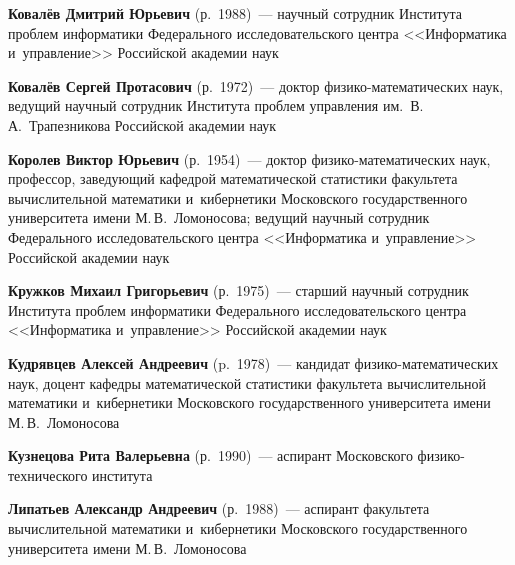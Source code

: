 \begin{multicols}{2}
   \vspace*{3pt}
   




\noindent
  \textbf{Ковалёв Дмитрий Юрьевич} (р.\ 1988)~--- научный сотрудник Института проб\-лем 
  информатики Федерального исследовательского цент\-ра <<Информатика и~управ\-ле\-ние>> 
  Российской академии наук

   \vspace*{3pt}
   
\noindent
\textbf{Ковалёв Сергей Протасович} (р.\ 1972)~--- 
доктор фи\-зи\-ко-ма\-те\-ма\-ти\-че\-ских наук, ведущий научный 
сотрудник Института проб\-лем управления им.\ В.\,А.~Трапезникова 
Российской академии наук

   \vspace*{3pt}
   
      \noindent
   \textbf{Королев Виктор Юрьевич} (р.\ 1954)~--- 
   доктор фи\-зи\-ко-ма\-те\-ма\-ти\-че\-ских наук, профессор, за\-ве\-ду\-ющий 
   кафедрой математической статистики факультета вычислительной математики 
   и~кибернетики Мос\-ков\-ско\-го государственного университета имени М.\,В.~Ломоносова; 
   ведущий научный сотрудник Федерального исследовательского цент\-ра <<Информатика и~управ\-ле\-ние>>
   Российской академии наук
   
\noindent
\textbf{Кружков Михаил Григорьевич} (р.\ 1975)~--- 
старший научный сотрудник Института проб\-лем информатики Федерального исследовательского цент\-ра 
<<Информатика и~управ\-ле\-ние>> Российской академии наук

   
   \pagebreak
   
\noindent
\textbf{Кудрявцев Алексей Андреевич} (p.\ 1978)~--- 
кандидат фи\-зи\-ко-ма\-те\-ма\-ти\-че\-ских наук, доцент кафедры математической статистики 
факультета вычислительной математики и~кибернетики Московского государственного университета имени 
М.\,В.~Ломоносова

   \vspace*{3pt}
   
\noindent
\textbf{Кузнецова Рита Валерьевна} (р.\ 1990)~--- аспирант Московского фи\-зи\-ко-тех\-ни\-че\-ско\-го института

\vspace*{3pt}

\noindent
\textbf{Липатьев Александр Андреевич} (р.\ 1988)~--- 
аспирант факультета вычислительной математики и~кибернетики Московского государственного университета 
имени М.\,В.~Ломоносова


\end{multicols}
